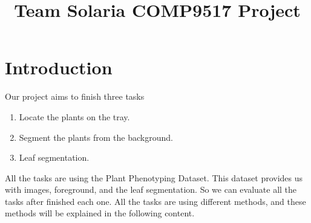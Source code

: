 \documentclass[conference]{IEEEtran}
\begin{document}
%
\title{Team Solaria COMP9517 Project}


\author{
\and
{}
\and
{}
\and
{}
\and
{}
\and
}


\maketitle
\IEEEpeerreviewmaketitle



\section{Introduction}

Our project aims to finish three tasks

\begin{enumerate}
\item Locate the plants on the tray.
\item Segment the plants from the background.
\item Leaf segmentation.
\end{enumerate}

All the tasks are using the Plant Phenotyping Dataset. This dataset provides us with images, foreground, and the leaf segmentation. So we can evaluate all the tasks after finished each one. All the tasks are using different methods, and these methods will be explained in the following content.
\end{document}
